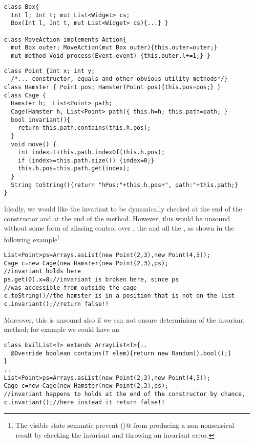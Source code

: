\begin{lstlisting}
class Box{
  Int l; Int t; mut List<Widget> cs;
  Box(Int l, Int t, mut List<Widget> cs){...} }

class MoveAction implements Action{
  mut Box outer; MoveAction(mut Box outer){this.outer=outer;}
  mut method Void process(Event event) {this.outer.l+=1;} }
\end{lstlisting}

\begin{lstlisting}
class Point {int x; int y;
  /*... constructor, equals and other obvious utility methods*/}
class Hamster { Point pos; Hamster(Point pos){this.pos=pos;} }
class Cage {
  Hamster h;  List<Point> path;
  Cage(Hamster h, List<Point> path){ this.h=h; this.path=path; }
  bool invariant(){
    return this.path.contains(this.h.pos);
  }
  void move() {
    int index=1+this.path.indexOf(this.h.pos);
    if (index>=this.path.size()) {index=0;}
    this.h.pos=this.path.get(index);
  }
  String toString(){return "hPos:"+this.h.pos+", path:"+this.path;}
}
\end{lstlisting}
Ideally, we would like the invariant to be dynamically checked 
at the end of the constructor and at the end of the \Q@move@ method.
However, this would be unsound without some form of aliasing control over \Q@Hamster@,
the \Q@List@ and all the \Q@Point@s, as shown in the following example\footnote{
The visible state semantic prevent \Q@toString()@ from producing a non nonsensical result
by checking the invariant and throwing an invariant error.
}
\begin{lstlisting}
List<Point>ps=Arrays.asList(new Point(2,3),new Point(4,5));
Cage c=new Cage(new Hamster(new Point(2,3),ps);
//invariant holds here
ps.get(0).x=8;//invariant is broken here, since ps
//was accessible from outside the cage
c.toString()//the hamster is in a position that is not on the list
c.invariant();//return false!!
\end{lstlisting}

Moreover, this is unsound also if we can not ensure determinism of the invariant method;
for example we could have an \Q@EvilList@

\begin{lstlisting}
class EvilList<T> extends ArrayList<T>{..
  @Override boolean contains(T elem){return new Random().bool();}
}
..
List<Point>ps=Arrays.asList(new Point(2,3),new Point(4,5));
Cage c=new Cage(new Hamster(new Point(2,3),ps);
//invariant happens to holds at the end of the constructor by chance,
c.invariant();//here instead it return false!!
\end{lstlisting}

